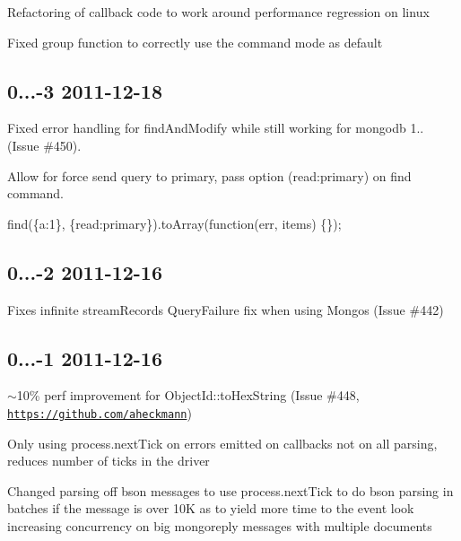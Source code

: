 \begin{DoxyItemize}
\item Refactoring of callback code to work around performance regression on linux
\item Fixed group function to correctly use the command mode as default
\end{DoxyItemize}

\subsection*{0...-\/3 2011-\/12-\/18 }


\begin{DoxyItemize}
\item Fixed error handling for find\+And\+Modify while still working for mongodb 1.. (Issue \#450).
\item Allow for force send query to primary, pass option (read\+:\textquotesingle{}primary\textquotesingle{}) on find command.
\begin{DoxyItemize}
\item {\ttfamily find(\{a\+:1\}, \{read\+:\textquotesingle{}primary\textquotesingle{}\}).to\+Array(function(err, items) \{\});}
\end{DoxyItemize}
\end{DoxyItemize}

\subsection*{0...-\/2 2011-\/12-\/16 }


\begin{DoxyItemize}
\item Fixes infinite stream\+Records Query\+Failure fix when using Mongos (Issue \#442)
\end{DoxyItemize}

\subsection*{0...-\/1 2011-\/12-\/16 }


\begin{DoxyItemize}
\item $\sim$10\% perf improvement for Object\+Id\+::to\+Hex\+String (Issue \#448, \href{https://github.com/aheckmann}{\tt https\+://github.\+com/aheckmann})
\item Only using process.\+next\+Tick on errors emitted on callbacks not on all parsing, reduces number of ticks in the driver
\item Changed parsing off bson messages to use process.\+next\+Tick to do bson parsing in batches if the message is over 10K as to yield more time to the event look increasing concurrency on big mongoreply messages with multiple documents
\end{DoxyItemize}


